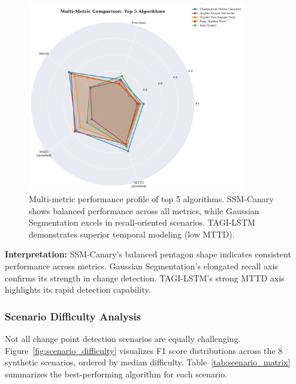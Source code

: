 \begin{figure}[H]
\centering
\includegraphics[width=0.85\textwidth]{figures/fig_radar_metrics.pdf}
\caption{Multi-metric performance profile of top 5 algorithms. SSM-Canary shows balanced performance across all metrics, while Gaussian Segmentation excels in recall-oriented scenarios. TAGI-LSTM demonstrates superior temporal modeling (low MTTD).}
\label{fig:radar_metrics}
\end{figure}

\textbf{Interpretation:} SSM-Canary's balanced pentagon shape indicates consistent performance across metrics. Gaussian Segmentation's elongated recall axis confirms its strength in change detection. TAGI-LSTM's strong MTTD axis highlights its rapid detection capability.


\subsubsection{Scenario Difficulty Analysis}

Not all change point detection scenarios are equally challenging. Figure~\ref{fig:scenario_difficulty} visualizes F1 score distributions across the 8 synthetic scenarios, ordered by median difficulty. Table~\ref{tab:scenario_matrix} summarizes the best-performing algorithm for each scenario.

